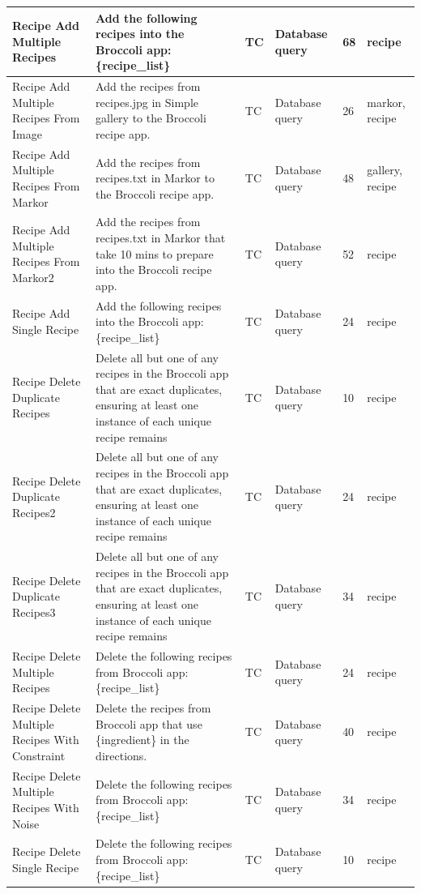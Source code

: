 \documentclass{article}
\begin{document}
\begin{appendices}
\begin{longtable}{>{\RaggedRight\seqsplit}p{.8in}p{2in}p{.3in}p{.5in}p{.3in}p{.5in}}
\midrule
Recipe Add Multiple Recipes & Add the following recipes into the Broccoli app: \{recipe\_list\} & TC & Database query & 68 & recipe \\
\midrule
Recipe Add Multiple Recipes From Image & Add the recipes from recipes.jpg in Simple gallery to the Broccoli recipe app. & TC & Database query & 26 & markor, recipe \\
\midrule
Recipe Add Multiple Recipes From Markor & Add the recipes from recipes.txt in Markor to the Broccoli recipe app. & TC & Database query & 48 & gallery, recipe \\
\midrule
Recipe Add Multiple Recipes From Markor2 & Add the recipes from recipes.txt in Markor that take 10 mins to prepare into the Broccoli recipe app. & TC & Database query & 52 & recipe \\
\midrule
Recipe Add Single Recipe & Add the following recipes into the Broccoli app: \{recipe\_list\} & TC & Database query & 24 & recipe \\
\midrule
Recipe Delete Duplicate Recipes & Delete all but one of any recipes in the Broccoli app that are exact duplicates, ensuring at least one instance of each unique recipe remains & TC & Database query & 10 & recipe \\
\midrule
Recipe Delete Duplicate Recipes2 & Delete all but one of any recipes in the Broccoli app that are exact duplicates, ensuring at least one instance of each unique recipe remains & TC & Database query & 24 & recipe \\
\midrule
Recipe Delete Duplicate Recipes3 & Delete all but one of any recipes in the Broccoli app that are exact duplicates, ensuring at least one instance of each unique recipe remains & TC & Database query & 34 & recipe \\
\midrule
Recipe Delete Multiple Recipes & Delete the following recipes from Broccoli app: \{recipe\_list\} & TC & Database query & 24 & recipe \\
\midrule
Recipe Delete Multiple Recipes With Constraint & Delete the recipes from Broccoli app that use \{ingredient\} in the directions. & TC & Database query & 40 & recipe \\
\midrule
Recipe Delete Multiple Recipes With Noise & Delete the following recipes from Broccoli app: \{recipe\_list\} & TC & Database query & 34 & recipe \\
\midrule
Recipe Delete Single Recipe & Delete the following recipes from Broccoli app: \{recipe\_list\} & TC & Database query & 10 & recipe \\

\end{longtable}
\end{appendices}
\end{document}
